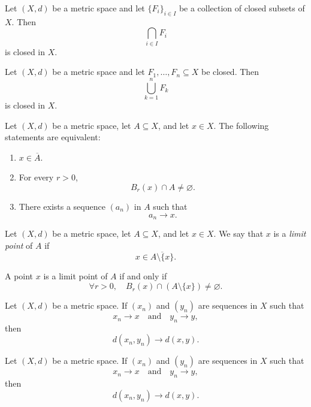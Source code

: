 \begin{theorem}
Let $(X,d)$ be a metric space and let $\{F_i\}_{i \in I}$ be a collection of
closed subsets of $X$. Then
\[
\bigcap_{i \in I} F_i
\]
is closed in $X$.
\end{theorem}

\begin{theorem}
Let $(X,d)$ be a metric space and let $F_1,\dots,F_n \subseteq X$ be closed.
Then
\[
\bigcup_{k=1}^n F_k
\]
is closed in $X$.
\end{theorem}


\begin{theorem}
Let $(X,d)$ be a metric space, let $A \subseteq X$, and let $x \in X$.
The following statements are equivalent:

\begin{enumerate}
    \item[(a)] $x \in \overline{A}$.
    \item[(b)] For every $r > 0$,
    \[
    B_r(x) \cap A \neq \varnothing.
    \]
    \item[(c)] There exists a sequence $(a_n)$ in $A$ such that
    \[
    a_n \to x.
    \]
\end{enumerate}
\end{theorem}


\begin{definition}
Let $(X,d)$ be a metric space, let $A \subseteq X$, and let $x \in X$.
We say that $x$ is a \emph{limit point} of $A$ if
\[
x \in \overline{A \setminus \{x\}}.
\]
\end{definition}

\begin{remark}
A point $x$ is a limit point of $A$ if and only if
\[
\forall r > 0,\quad
B_r(x) \cap (A \setminus \{x\}) \neq \varnothing.
\]
\end{remark}

\begin{theorem}
Let $(X,d)$ be a metric space. 
If $(x_n)$ and $(y_n)$ are sequences in $X$ such that
\[
x_n \to x
\quad \text{and} \quad
y_n \to y,
\]
then
\[
d(x_n, y_n) \to d(x,y).
\]
\end{theorem}

\begin{theorem}
Let $(X,d)$ be a metric space. 
If $(x_n)$ and $(y_n)$ are sequences in $X$ such that
\[
x_n \to x
\quad \text{and} \quad
y_n \to y,
\]
then
\[
d(x_n, y_n) \to d(x,y).
\]
\end{theorem}











